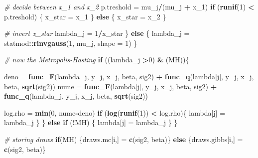 \documentclass[
]{article}
\newenvironment{Shaded}{\begin{snugshade}}{\end{snugshade}}
\newcommand{\CommentTok}[1]{\textcolor[rgb]{0.56,0.35,0.01}{\textit{#1}}}
\newcommand{\ControlFlowTok}[1]{\textcolor[rgb]{0.13,0.29,0.53}{\textbf{#1}}}
\newcommand{\DataTypeTok}[1]{\textcolor[rgb]{0.13,0.29,0.53}{#1}}
\newcommand{\DecValTok}[1]{\textcolor[rgb]{0.00,0.00,0.81}{#1}}
\newcommand{\KeywordTok}[1]{\textcolor[rgb]{0.13,0.29,0.53}{\textbf{#1}}}
\newcommand{\NormalTok}[1]{#1}
\newcommand{\OperatorTok}[1]{\textcolor[rgb]{0.81,0.36,0.00}{\textbf{#1}}}
\newcommand{\StringTok}[1]{\textcolor[rgb]{0.31,0.60,0.02}{#1}}
\begin{document}
\begin{Shaded}
\begin{Highlighting}[]
{{{{{{        \CommentTok{# decide between x_1 and x_2}
\NormalTok{        p.treshold =}\StringTok{ }\NormalTok{mu_j}\OperatorTok{/}\NormalTok{(mu_j }\OperatorTok{+}\StringTok{ }\NormalTok{x_}\DecValTok{1}\NormalTok{)}
        \ControlFlowTok{if}\NormalTok{ (}\KeywordTok{runif}\NormalTok{(}\DecValTok{1}\NormalTok{) }\OperatorTok{<}\StringTok{ }\NormalTok{p.treshold)}
\NormalTok{        \{}
\NormalTok{          x_star =}\StringTok{ }\NormalTok{x_}\DecValTok{1}
\NormalTok{        \}}
        \ControlFlowTok{else}
\NormalTok{        \{}
\NormalTok{          x_star =}\StringTok{ }\NormalTok{x_}\DecValTok{2}
\NormalTok{        \}}
        
        \CommentTok{# invert x_star}
\NormalTok{        lambda_j =}\StringTok{ }\DecValTok{1}\OperatorTok{/}\NormalTok{x_star}
\NormalTok{      \}}
      \ControlFlowTok{else}
\NormalTok{      \{}
\NormalTok{        lambda_j =}\StringTok{ }\NormalTok{statmod}\OperatorTok{::}\KeywordTok{rinvgauss}\NormalTok{(}\DecValTok{1}\NormalTok{, mu_j, }\DataTypeTok{shape =} \DecValTok{1}\NormalTok{) }
\NormalTok{      \}}
      
      
      \CommentTok{# now the Metropolis-Hasting}
      \ControlFlowTok{if}\NormalTok{ ((lambda_j }\OperatorTok{>}\DecValTok{0}\NormalTok{) }\OperatorTok{&}\StringTok{ }\NormalTok{(MH))\{}
        
\NormalTok{        deno =}\StringTok{ }\KeywordTok{func_F}\NormalTok{(lambda_j, y_j, x_j, beta, sig2) }\OperatorTok{+}\StringTok{ }\KeywordTok{func_q}\NormalTok{(lambda[j], y_j, x_j, beta, }\KeywordTok{sqrt}\NormalTok{(sig2))}
\NormalTok{        nume =}\StringTok{ }\KeywordTok{func_F}\NormalTok{(lambda[j], y_j, x_j, beta, sig2) }\OperatorTok{+}\StringTok{ }\KeywordTok{func_q}\NormalTok{(lambda_j, y_j, x_j, beta, }\KeywordTok{sqrt}\NormalTok{(sig2))}
        
\NormalTok{        log.rho =}\StringTok{ }\KeywordTok{min}\NormalTok{(}\DecValTok{0}\NormalTok{, nume}\OperatorTok{-}\NormalTok{deno)}
        \ControlFlowTok{if}\NormalTok{ (}\KeywordTok{log}\NormalTok{(}\KeywordTok{runif}\NormalTok{(}\DecValTok{1}\NormalTok{)) }\OperatorTok{<}\StringTok{ }\NormalTok{log.rho)\{}
\NormalTok{          lambda[j] =}\StringTok{ }\NormalTok{lambda_j}
\NormalTok{        \}}
\NormalTok{      \} }
      \ControlFlowTok{else} \ControlFlowTok{if}\NormalTok{ (}\OperatorTok{!}\NormalTok{MH)}
\NormalTok{      \{}
\NormalTok{        lambda[j] =}\StringTok{ }\NormalTok{lambda_j}
\NormalTok{      \}}
\NormalTok{    \}}
    
    \CommentTok{# storing draws}
    \ControlFlowTok{if}\NormalTok{(MH)}
\NormalTok{    \{draws.mc[i,] =}\StringTok{ }\KeywordTok{c}\NormalTok{(sig2, beta)\}}
    \ControlFlowTok{else}
\NormalTok{    \{draws.gibbs[i,] =}\StringTok{ }\KeywordTok{c}\NormalTok{(sig2, beta)\}}
    
}}}}}}
\end{Highlighting}
\end{Shaded}
\end{document}
